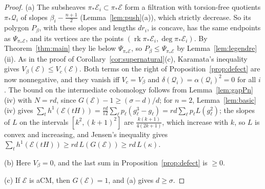 \documentclass[11pt]{amsart}
\theoremstyle{definition}
\theoremstyle{remark}
\newcommand{\cE}{\mathcal{E}}
\newcommand{\cQ}{\mathcal{Q}}
\DeclareMathOperator{\rk}{rk}
\begin{document}
\begin{proof}
(a) The subsheaves $\pi_*\cE_i\subset\pi_*\cE$ form a filtration with torsion-free quotients $\pi_*\cQ_i$ of slopes $\beta_i-\frac{n+1}2$ (Lemma~\ref{lem:push}(a)), which strictly decrease. So its polygon $P_\beta$, with these slopes and lengths $dr_i$, is concave, has the same endpoints as $\Psi_{\pi_*\cE}$, and its vertices are the points $(\rk\pi_*\cE_i,\deg\pi_*\cE_i)$. By Theorem~\ref{thm:main} they lie below $\Psi_{\pi_*\cE}$, so $P_\beta\le\Psi_{\pi_*\cE}$ by Lemma~\ref{lem:legendre}(ii). As in the proof of Corollary~\ref{cor:supernatural}(c), Karamata's inequality gives $V_\beta(\cE)\le V_c(\cE)$. Both terms on the right of Proposition~\ref{prop:defect} are now nonnegative, and they vanish iff $V_c=V_\beta$ and $\delta(\cQ_i)=\alpha(\cQ_i)^2=0$ for all $i$. The bound on the intermediate cohomology follows from Lemma~\ref{lem:gapPn}(iv) with $N=rd$, since $G(\cE)-1\ge(\sigma-d)/d$; for $n=2$, Lemma~\ref{lem:basic}(iv) gives $\sum_th^1(\cE(tH))=\frac{rd}{12}\sum_\ell p_\ell(g_\ell^3-g_\ell)=rd\sum_\ell p_\ell L(g_\ell^2)$; the slopes of $L$ on the intervals $[k^2,(k+1)^2]$ are $\frac{k(k+1)}{4(2k+1)}$, which increase with $k$, so $L$ is convex and increasing, and Jensen's inequality gives $\sum_th^1(\cE(tH))\ge rd\,L(G(\cE))\ge rd\,L(\kappa)$.

(b) Here $V_\beta=0$, and the last sum in Proposition~\ref{prop:defect} is $\ge0$.

(c) If $\cE$ is aCM, then $G(\cE)=1$, and (a) gives $d\ge\sigma$.
\end{proof}
\end{document}
